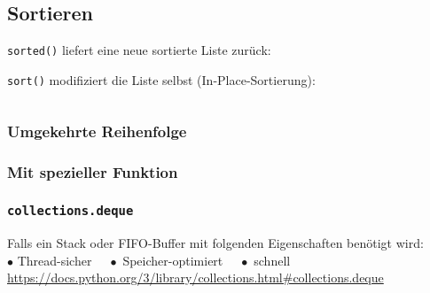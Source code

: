 \begin{minipage}[t]{0.49\textwidth}
	\subsection{Sortieren}
	\texttt{sorted()} liefert eine neue sortierte Liste zurück:
	
	\texttt{sort()} modifiziert die Liste selbst (In-Place-Sortierung):
	
\end{minipage}
\begin{minipage}[t]{0.02\textwidth} $ \quad $\end{minipage}
\begin{minipage}[t]{0.49\textwidth}
	\subsubsection{Umgekehrte Reihenfolge}
	
	
	\subsubsection{Mit spezieller Funktion}
	
\end{minipage}


\subsubsection{\texttt{collections.deque}}
Falls ein Stack oder FIFO-Buffer mit folgenden Eigenschaften benötigt wird:\\
$\bullet$ Thread-sicher $\quad \bullet$ Speicher-optimiert $\quad \bullet$ schnell\\
\url{https://docs.python.org/3/library/collections.html#collections.deque}


